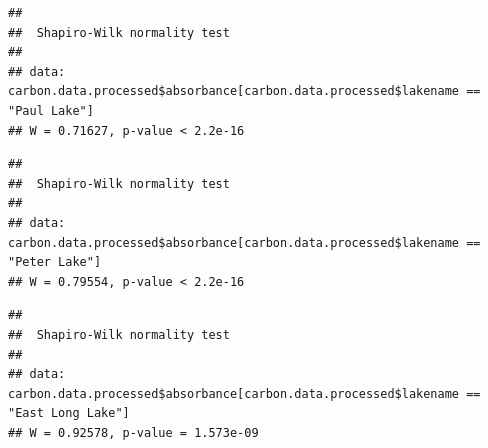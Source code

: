 \documentclass[12pt,]{article}
\newenvironment{Shaded}{\begin{snugshade}}{\end{snugshade}}
\newcommand{\KeywordTok}[1]{\textcolor[rgb]{0.13,0.29,0.53}{\textbf{#1}}}
\newcommand{\StringTok}[1]{\textcolor[rgb]{0.31,0.60,0.02}{#1}}
\newcommand{\OperatorTok}[1]{\textcolor[rgb]{0.81,0.36,0.00}{\textbf{#1}}}
\newcommand{\NormalTok}[1]{#1}
\begin{document}
\begin{Shaded}
\end{Shaded}

\begin{verbatim}
## 
##  Shapiro-Wilk normality test
## 
## data:  carbon.data.processed$absorbance[carbon.data.processed$lakename ==     "Paul Lake"]
## W = 0.71627, p-value < 2.2e-16
\end{verbatim}

\begin{Shaded}
\end{Shaded}

\begin{verbatim}
## 
##  Shapiro-Wilk normality test
## 
## data:  carbon.data.processed$absorbance[carbon.data.processed$lakename ==     "Peter Lake"]
## W = 0.79554, p-value < 2.2e-16
\end{verbatim}

\begin{Shaded}
\end{Shaded}

\begin{verbatim}
## 
##  Shapiro-Wilk normality test
## 
## data:  carbon.data.processed$absorbance[carbon.data.processed$lakename ==     "East Long Lake"]
## W = 0.92578, p-value = 1.573e-09
\end{verbatim}

\begin{Shaded}
\end{Shaded}
\end{document}
